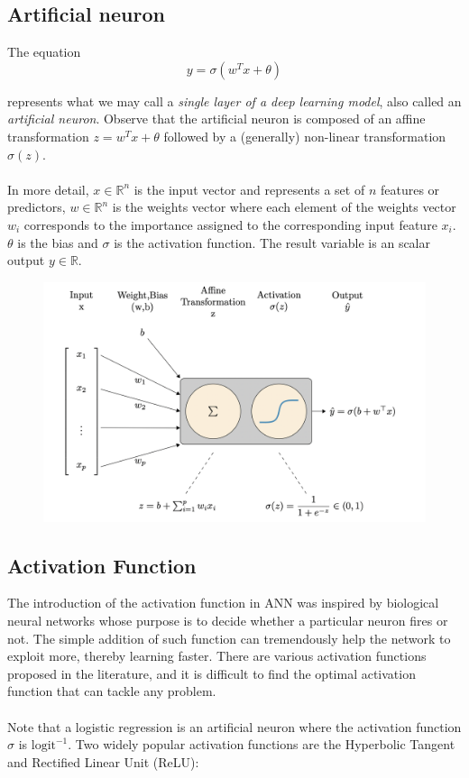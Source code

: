 \documentclass[../main.tex]{subfiles}
\begin{document}
	 \subsection{Artificial neuron}
	 \noindent The equation
	  \begin{equation}
	  	y=\sigma(w^Tx + \theta) \tag{2}
	  	\label{eq:sig}
	  \end{equation}
  
   \noindent represents what we may call a \textit{single layer of a deep learning model}, also called an \textit{artificial neuron}.  Observe that the artificial neuron is composed of an affine transformation $ z=w^Tx + \theta$ followed by a (generally) non-linear transformation $\sigma(z)$. \\ \\ In more detail, $x \in \mathbb{R}^n$ is the input vector and represents a set of $n$ features or predictors, $w\in  \mathbb{R}^n$ is the weights vector where each element of the weights vector $w_i$ corresponds to the importance assigned to the corresponding input feature $x_i$. $\theta$ is the bias and $\sigma$ is the activation function. The result variable is an scalar output $y \in \mathbb{R}$. 
 
   
   \begin{figure}[h]
   	\centering
   	\includegraphics[width=0.8\linewidth]{imgs/neu}
   \end{figure} \mbox{} \par
   
  
 \subsection{Activation Function}
 
 
 
 
 \noindent The introduction of the activation function in ANN was inspired by biological neural networks whose purpose is to decide whether a particular neuron fires or not. The simple addition of such function can tremendously help the network to exploit more, thereby learning faster. There are various activation functions proposed in the literature, and it is difficult to find the optimal activation function that can tackle any problem. \\ \\ 
	 	\noindent Note that a logistic regression is an artificial neuron where the activation function  $\sigma$ is $\text{logit}^{-1}$. Two widely popular activation functions are the Hyperbolic Tangent and Rectified Linear Unit (ReLU):
	 	
\end{document}
